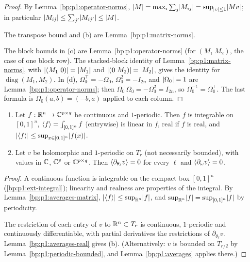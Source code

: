 \begin{proof}
\label{step:p2:matrix-op}
By Lemma~\ref{bp:p1:operator-norms}, $\lvert M\rvert=\max_i\sum_j\lvert M_{ij}\rvert=\sup_{\lvert v\rvert\le1}\lvert Mv\rvert$; in
particular $\lvert M_{ij}\rvert\le\sum_{j'}\lvert M_{ij'}\rvert\le\lvert M\rvert$.

\label{step:p2:matrix-transpose}
The transpose bound and (b) are Lemma~\ref{bp:p1:matrix-norms}.

\label{step:p2:matrix-blocks}
The block bounds in (c) are Lemma~\ref{bp:p1:operator-norms} (for $(M_1\ M_2)$, the case of one block
row). The stacked-block identity of Lemma~\ref{bp:p1:matrix-norms}, with $\lvert (M_1\ 0)\rvert=\lvert M_1\rvert$ and
$\lvert (0\ M_2)\rvert=\lvert M_2\rvert$, gives the identity for $\operatorname{diag}(M_1,M_2)$. In (d),
$\Omega_0^\top=-\Omega_0$, $\Omega_0^2=-I_{2n}$ and $\lvert \Omega_0\rvert=1$ are Lemma~\ref{bp:p1:operator-norms};
then $\Omega_0^\top\Omega_0=-\Omega_0^2=I_{2n}$, so $\Omega_0^{-1}=\Omega_0^\top$. The last formula is
$\Omega_0(a,b)=(-b,a)$ applied to each column.
\end{proof}

\begin{corollary}[Averages]\label{bp:p2:averages}
\begin{enumerate}[label=(\alph*)]
\item Let $f:\mathbb{R}^n\to\mathbb{C}^{p\times q}$ be continuous and $1$-periodic. Then $f$ is integrable on $[0,1]^n$,
  $\langle f\rangle=\int_{[0,1]^n}f$ (entrywise) is linear in $f$, real if $f$ is real, and
  $\lvert \langle f\rangle\rvert\le\sup_{x\in[0,1]^n}\lvert f(x)\rvert$.
\item Let $v$ be holomorphic and $1$-periodic on $T_r$ (not necessarily bounded), with values in
  $\mathbb{C}$, $\mathbb{C}^p$ or $\mathbb{C}^{p\times q}$. Then $\langle \partial_{\theta_\ell}v\rangle=0$ for every $\ell$ and
  $\langle \partial_\omega v\rangle=0$.
\end{enumerate}
\end{corollary}

\begin{proof}
\label{step:p2:avg-bound}
A continuous function is integrable on the compact box $[0,1]^n$ (\ref{bp:p1:ext-integral}); linearity
and realness are properties of the integral. By Lemma~\ref{bp:p1:averages-matrix},
$\lvert \langle f\rangle\rvert\le\sup_{\mathbb{R}^n}\lvert f\rvert$, and $\sup_{\mathbb{R}^n}\lvert f\rvert=\sup_{[0,1]^n}\lvert f\rvert$ by periodicity.

\label{step:p2:avg-deriv}
The restriction of each entry of $v$ to $\mathbb{R}^n\subset T_r$ is continuous, $1$-periodic and
continuously differentiable, with partial derivatives the restrictions of $\partial_{\theta_\ell}v$.
Lemma~\ref{bp:p1:averages-real} gives (b). (Alternatively: $v$ is bounded on $T_{r/2}$ by
Lemma~\ref{bp:p1:periodic-bounded}, and Lemma~\ref{bp:p1:averages} applies there.)
\end{proof}

